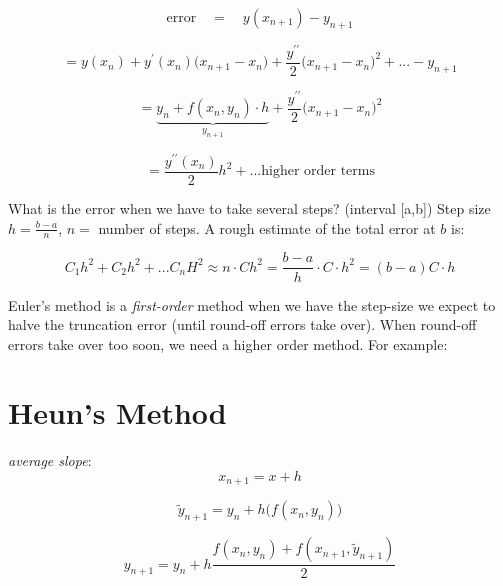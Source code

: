 \documentclass[a4paper,12pt]{report}
\begin{document}
	$$\text{error} \quad = \quad y(x_{n+1})-y_{n+1}$$
	
	$$= y(x_n) + y^ \prime (x_n) \big(x_{n+1}-x_n  \big)
	+ \frac{y^{\prime \prime}}{2} \big( x_{n+1} - x_n  \big)^2 + ... - y_{n+1}$$
	
	$$ = \underbrace{y_n + f(x_n, y_n) \cdot h}_{y_{n+1}}
	+ \frac{y^{\prime \prime}}{2} \big( x_{n+1} - x_n  \big)^2 $$
	
	$$ = \frac{y^{\prime \prime}(x_n)}{2}h^2 + ... \text{higher order terms} $$
	
	\vspace{5mm}
	
	\noindent What is the error when we have to take several steps? (interval [a,b])  Step size $h = \frac{b-a}{n}$, $n=$ number of steps.
	A rough estimate of the total error at $b$ is:
	
	$$ C_1h^2 + C_2h^2 + ... C_n H^2 \approx n \cdot C h^2 = \frac{b-a}{h} \cdot C \cdot  h^2 = (b-a) C \cdot h$$
	
	\vspace{5mm}
	
	Euler's method is a \textit{first-order} method when we have the step-size we expect to halve the truncation error (until round-off errors 
	take over).  When round-off errors take over too soon, we need a higher order method.  For example:
	
	\section{Heun's Method}
	\begin{multicols}{2}
	
	\noindent \textit{average slope}:
	$$x_{n+1} = x + h$$
	
	$$ \tilde y _{n+1} = y_n + h \big( f(x_n, y_n) \big) $$
	
	$$y_{n+1} = y_n+h \frac{f(x_n, y_n)+f(x_{n+1}, \tilde y_{n+1})}{2} $$
	
	\end{multicols}
\end{document}
